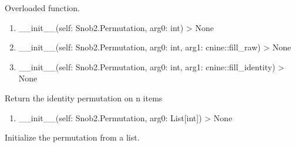 \documentclass[letterpaper,10pt,english]{sphinxmanual}
\begin{document}
\begin{fulllineitems}

\begin{fulllineitems}
\label{\detokenize{index:Snob2.Permutation.__init__}}
\sphinxAtStartPar
Overloaded function.
\begin{enumerate}
%
\item {} 
\sphinxAtStartPar
\_\_init\_\_(self: Snob2.Permutation, arg0: int) \sphinxhyphen{}\textgreater{} None

\item {} 
\sphinxAtStartPar
\_\_init\_\_(self: Snob2.Permutation, arg0: int, arg1: cnine::fill\_raw) \sphinxhyphen{}\textgreater{} None

\item {} 
\sphinxAtStartPar
\_\_init\_\_(self: Snob2.Permutation, arg0: int, arg1: cnine::fill\_identity) \sphinxhyphen{}\textgreater{} None

\end{enumerate}

\sphinxAtStartPar
Return the identity permutation on n items
\begin{enumerate}
%
\setcounter{enumi}{3}
\item {} 
\sphinxAtStartPar
\_\_init\_\_(self: Snob2.Permutation, arg0: List{[}int{]}) \sphinxhyphen{}\textgreater{} None

\end{enumerate}

\sphinxAtStartPar
Initialize the permutation from a list.

\end{fulllineitems}


\begin{fulllineitems}
\label{\detokenize{index:Snob2.Permutation.__inv__}}
\end{fulllineitems}


\end{fulllineitems}
\end{document}
